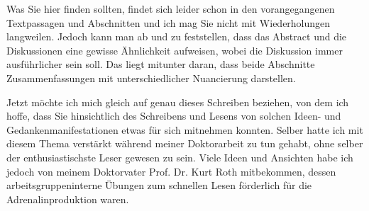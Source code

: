 \documentclass[10pt,twocolumn]{scrartcl}
\begin{document}
Was Sie hier finden sollten, findet sich leider schon in den vorangegangenen
Textpassagen und Abschnitten und ich mag Sie nicht mit Wiederholungen
langweilen. Jedoch kann man ab und zu feststellen, dass das Abstract und
die Diskussionen eine gewisse Ähnlichkeit aufweisen, wobei die Diskussion
immer ausführlicher sein soll. Das liegt mitunter daran, dass beide 
Abschnitte Zusammenfassungen mit unterschiedlicher Nuancierung darstellen. 

Jetzt möchte ich mich gleich auf genau dieses Schreiben beziehen, 
von dem ich hoffe, dass Sie hinsichtlich des Schreibens und Lesens 
von solchen Ideen- und Gedankenmanifestationen etwas für sich mitnehmen konnten. 
Selber hatte ich mit diesem Thema verstärkt während meiner Doktorarbeit \cite{Gerhards2008} 
zu tun gehabt, ohne selber der enthusiastischste Leser gewesen zu sein.
Viele Ideen und Ansichten habe ich jedoch von meinem Doktorvater 
Prof. Dr. Kurt Roth mitbekommen, dessen arbeitsgruppeninterne Übungen 
zum schnellen Lesen förderlich für die Adrenalinproduktion waren.

% 

\end{document}
